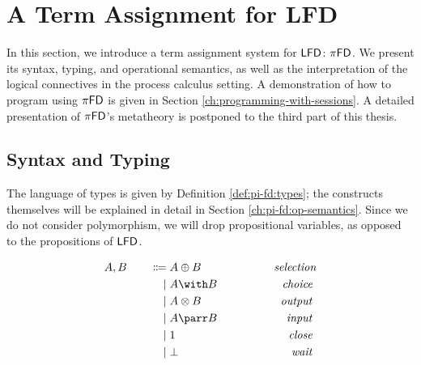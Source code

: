 \chapter{A Term Assignment for LFD}\label{ch:pi-fd}

In this section, we introduce a term assignment system for $\textsf{LFD}$: $\pi\textsf{FD}$.
We present its syntax, typing, and operational semantics, as well as the
interpretation of the logical connectives in the process calculus setting.
A demonstration of how to program using $\pi\textsf{FD}$ is given in
Section \ref{ch:programming-with-sessions}. A detailed presentation of
$\pi\textsf{FD}$'s metatheory is postponed to the third part of this thesis.

\section{Syntax and Typing}
The language of types is given by Definition \ref{def:pi-fd:types};
the constructs themselves will be explained in detail in Section \ref{ch:pi-fd:op-semantics}.
Since we do not consider polymorphism, we will drop propositional variables,
as opposed to the propositions of $\textsf{LFD}$.

\begin{definition} \label{def:pi-fd:types}
  \begin{alignat*}{4}
    & A, B \; &&&\Coloneqq &\; A \oplus B  &\qquad \tag*{\textit{selection}} & \\
    &         &&&\mid      &\; A \with B   &\qquad \tag*{\textit{choice}   } & \\
    &         &&&\mid      &\; A \otimes B &\qquad \tag*{\textit{output}   } & \\
    &         &&&\mid      &\; A \parr B   &\qquad \tag*{\textit{input}    } & \\
    &         &&&\mid      &\; 1           &\qquad \tag*{\textit{close}    } & \\
    &         &&&\mid      &\; \bot        &\qquad \tag*{\textit{wait}     } &
  \end{alignat*}
\end{definition}

